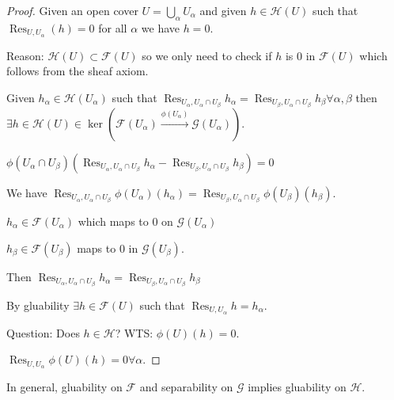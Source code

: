 \documentclass{article}
\theoremstyle{definition}
\begin{document}
    \begin{proof}
        Given an open cover \(U = \bigcup_{\alpha} U_\alpha\) and given \(h \in \mathcal{H} (U)\) such that \(\operatorname{Res}_{U,U_\alpha}(h) = 0\) for all \(\alpha\) we have \(h = 0\).

        Reason: \(\mathcal{H}(U) \subset \mathcal{F}(U)\) so we only need to check if \(h\) is \(0\) in \(\mathcal{F}(U)\) which follows from the sheaf axiom.

        Given \(h_\alpha \in \mathcal{H}(U_\alpha)\) such that \(\operatorname{Res}_{U_\alpha , U_\alpha \cap U_\beta} h_\alpha = \operatorname{Res}_{{U_\beta , U_\alpha \cap U_\beta}} h_\beta \forall \alpha ,\beta \) then \(\exists h \in \mathcal{H}(U) \in \ker \left( \mathcal{F}(U_\alpha) \xrightarrow{\phi(U_\alpha)} \mathcal{G}(U_\alpha) \right)\).

        \(\phi(U_\alpha \cap U_\beta) \left( \operatorname{Res}_{U_\alpha , U_\alpha \cap U_\beta} h_\alpha - \operatorname{Res}_{U_\beta , U_\alpha \cap U_\beta} h_\beta \right) = 0\) 

        We have \(\operatorname{Res}_{U_\alpha , U_\alpha \cap U_\beta} \phi(U_\alpha)(h_\alpha) = \operatorname{Res}_{U_\beta , U_\alpha \cap U_\beta} \phi(U_\beta) (h_\beta)\).

        \(h_\alpha \in \mathcal{F}(U_\alpha)\) which maps to \(0\) on \(\mathcal{G}(U_\alpha)\) 

        \(h_\beta \in \mathcal{F}(U_\beta)\) maps to \(0\) in \(\mathcal{G}(U_\beta)\).

        Then \(\operatorname{Res}_{U_\alpha , U_\alpha \cap U_\beta} h_\alpha = \operatorname{Res}_{U_\beta , U_\alpha \cap U_\beta} h_\beta\) 

        By gluability \(\exists h \in \mathcal{F}(U)\) such that \(\operatorname{Res}_{U,U_\alpha} h = h_\alpha\).

        Question: Does \(h\in \mathcal{H}\)? WTS: \(\phi(U)(h) = 0\).
        
        \(\operatorname{Res}_{U,U_\alpha} \phi(U) (h) = 0 \forall \alpha\).

    \end{proof}

    In general, gluability on \(\mathcal{F}\) and separability on \(\mathcal{G}\) implies gluability on \(\mathcal{H}\).
\end{document}
